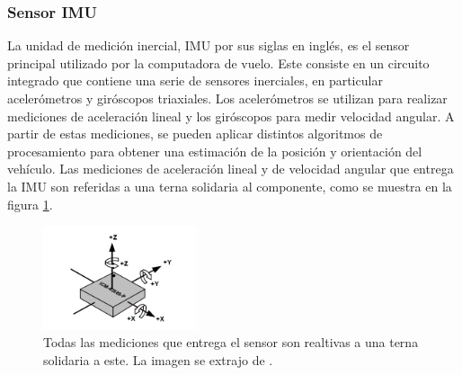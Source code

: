 









\subsubsection{Sensor IMU}\label{sec:IMU}

La unidad de medición inercial, IMU por sus siglas en inglés, es el sensor principal utilizado por la computadora de vuelo. Este consiste en un circuito integrado que contiene una serie de sensores inerciales, en particular acelerómetros y giróscopos triaxiales. Los acelerómetros se utilizan para realizar mediciones de aceleración lineal y los giróscopos para medir velocidad angular. A partir de estas mediciones, se pueden aplicar distintos algoritmos de procesamiento para obtener una estimación de la posición y orientación del vehículo. Las mediciones de aceleración lineal y de velocidad angular que entrega la IMU son referidas a una terna solidaria al componente, como se muestra en la figura \ref{fig:IMU_ejes}.

\begin{figure}[htb]
    \centering
    \includegraphics[width=0.4\textwidth]{img/IMU_ejes.png}
    \caption{Todas las mediciones que entrega el sensor son realtivas a una terna solidaria a este. La imagen se extrajo de \cite{ICM42688pDatasheet}.}
    \label{fig:IMU_ejes}
\end{figure}

